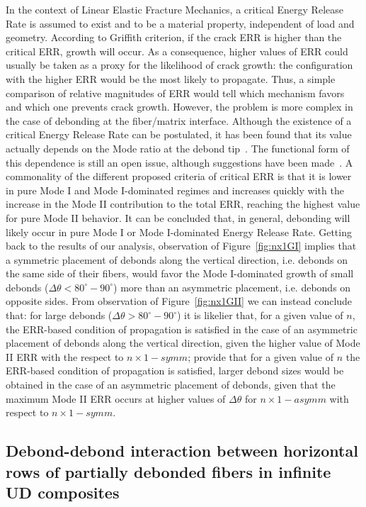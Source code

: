 \documentclass[smallextended]{svjour3}       %
\begin{document}
In the context of Linear Elastic Fracture Mechanics, a critical Energy Release Rate is assumed to exist and to be a material property, independent of load and geometry. According to Griffith criterion, if the crack ERR is higher than the critical ERR, growth will occur. As a consequence, higher values of ERR could usually be taken as a proxy for the likelihood of crack growth: the configuration with the higher ERR would be the most likely to propagate. Thus, a simple comparison of relative magnitudes of ERR would tell which mechanism favors and which one prevents crack growth. However, the problem is more complex in the case of debonding at the fiber/matrix interface. Although the existence of a critical Energy Release Rate can be postulated, it has been found that its value actually depends on the Mode ratio at the debond tip~\cite{Hutchinson1991}. The functional form of this dependence is still an open issue, although suggestions have been made~\cite{Hutchinson1991,Mantic2009}. A commonality of the different proposed criteria of critical ERR is that it is lower in pure Mode I and Mode I-dominated regimes and increases quickly with the increase in the Mode II contribution to the total ERR, reaching the highest value for pure Mode II behavior. It can be concluded that, in general, debonding will likely occur in pure Mode I or Mode I-dominated Energy Release Rate. Getting back to the results of our analysis, observation of Figure~\ref{fig:nx1GI} implies that a symmetric placement of debonds along the vertical direction, i.e. debonds on the same side of their fibers, would favor the Mode I-dominated growth of small debonds ($\Delta\theta<80^{\circ}-90^{\circ}$) more than an asymmetric placement, i.e. debonds on opposite sides. From observation of Figure~\ref{fig:nx1GII} we can instead conclude that: for large debonds ($\Delta\theta>80^{\circ}-90^{\circ}$) it is likelier that, for a given value of $n$, the ERR-based condition of propagation is satisfied in the case of an asymmetric placement of debonds along the vertical direction, given the higher value of Mode II ERR with the respect to $n\times 1-symm$; provide that for a given value of $n$ the ERR-based condition of propagation is satisfied, larger debond sizes would be obtained in the case of an asymmetric placement of debonds, given that the maximum Mode II ERR occurs at higher values of $\Delta\theta$ for $n\times 1-asymm$ with respect to $n\times 1-symm$.

\subsection{Debond-debond interaction between horizontal rows of partially debonded fibers in infinite UD composites}\label{subsec:horizontal}
\end{document}
